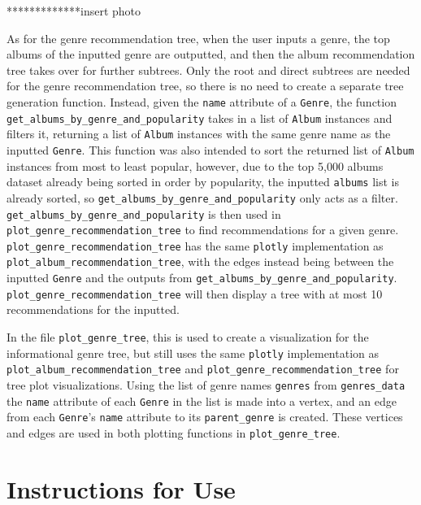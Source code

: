 \documentclass[fontsize=11pt]{article}
\begin{document}
*************insert photo \newline

As for the genre recommendation tree, when the user inputs a genre, the top albums of the inputted genre are outputted, and then the album recommendation tree takes over for further subtrees. Only the root and direct subtrees are needed for the genre recommendation tree, so there is no need to create a separate tree generation function. Instead, given the \texttt{name} attribute of a \texttt{Genre}, the function \texttt{get\_albums\_by\_genre\_and\_popularity} takes in a list of \texttt{Album} instances and filters it, returning a list of \texttt{Album} instances with the same genre name as the inputted \texttt{Genre}. This function was also intended to sort the returned list of \texttt{Album} instances from most to least popular, however, due to the top 5,000 albums dataset already being sorted in order by popularity, the inputted \texttt{albums} list is already sorted, so \texttt{get\_albums\_by\_genre\_and\_popularity} only acts as a filter. \texttt{get\_albums\_by\_genre\_and\_popularity} is then used in \texttt{plot\_genre\_recommendation\_tree} to find recommendations for a given genre. \texttt{plot\_genre\_recommendation\_tree} has the same \texttt{plotly} implementation as \texttt{plot\_album\_recommendation\_tree}, with the edges instead being between the inputted \texttt{Genre} and the outputs from \texttt{get\_albums\_by\_genre\_and\_popularity}. \texttt{plot\_genre\_recommendation\_tree} will then display a tree with at most 10 recommendations for the inputted. \newline

In the file \texttt{plot\_genre\_tree}, this is used to create a visualization for the informational genre tree, but still uses the same \texttt{plotly} implementation as \texttt{plot\_album\_recommendation\_tree} and \texttt{plot\_genre\_recommendation\_tree} for tree plot visualizations. Using the list of genre names \texttt{genres} from \texttt{genres\_data} the \texttt{name} attribute of each \texttt{Genre} in the list is made into a vertex, and an edge from each \texttt{Genre}'s \texttt{name} attribute to its \texttt{parent\_genre} is created. These vertices and edges are used in both plotting functions in \texttt{plot\_genre\_tree}. \newline

\section*{Instructions for Use}
\end{document}
